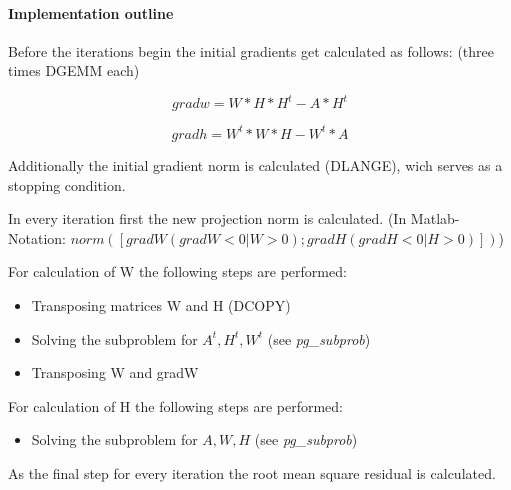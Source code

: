 \documentclass[a4paper,10pt]{scrartcl}
\begin{document}
			\paragraph{Implementation outline}


					Before the iterations begin the initial gradients get calculated as 
					follows: (three times DGEMM each)\newline

					\begin{equation*}
						gradw = W * H * H^t - A * H^t
					\end{equation*}
					
					\begin{equation*}
						gradh = W^t * W * H - W^t * A
					\end{equation*}

					Additionally the initial gradient norm is calculated (DLANGE), wich
					serves as a stopping condition.\newline

					In every iteration first the new projection norm is calculated. (In 
					Matlab-Notation: $norm([gradW(gradW <0 | W > 0); gradH(gradH <0 | H > 0)])$)\newline

					For calculation of W the following steps are performed:\newline

					\begin{itemize}
					 \item Transposing matrices W and H (DCOPY)\newline
					 \item Solving the subproblem for $A^t, H^t, W^t$ (see 	
						\emph{pg\_subprob})\newline
					 \item Transposing W and gradW\newline
					\end{itemize}


					For calculation of H the following steps are performed:\newline
					
					\begin{itemize}
					 \item Solving the subproblem for $A, W, H$ (see \emph{pg\_subprob})\newline
					\end{itemize}


					As the final step for every iteration the root mean square residual is
					calculated.
\end{document}
